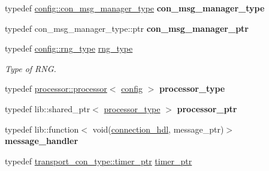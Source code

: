 \begin{DoxyCompactItemize}
\item 
typedef \hyperlink{classwebsocketpp_1_1message__buffer_1_1alloc_1_1con__msg__manager}{config\+::con\+\_\+msg\+\_\+manager\+\_\+type} {\bfseries con\+\_\+msg\+\_\+manager\+\_\+type}\hypertarget{classwebsocketpp_1_1connection_aa3fe3ecba9c63a04771c2ae34dd8dd56}{}\label{classwebsocketpp_1_1connection_aa3fe3ecba9c63a04771c2ae34dd8dd56}

\item 
typedef con\+\_\+msg\+\_\+manager\+\_\+type\+::ptr {\bfseries con\+\_\+msg\+\_\+manager\+\_\+ptr}\hypertarget{classwebsocketpp_1_1connection_a7bcb608b3a2a645bda4e4c4998f754c7}{}\label{classwebsocketpp_1_1connection_a7bcb608b3a2a645bda4e4c4998f754c7}

\item 
typedef \hyperlink{classwebsocketpp_1_1random_1_1none_1_1int__generator}{config\+::rng\+\_\+type} \hyperlink{classwebsocketpp_1_1connection_afc276f2f61d5b1acfadc64f91b3f89e5}{rng\+\_\+type}\hypertarget{classwebsocketpp_1_1connection_afc276f2f61d5b1acfadc64f91b3f89e5}{}\label{classwebsocketpp_1_1connection_afc276f2f61d5b1acfadc64f91b3f89e5}

\begin{DoxyCompactList}\small\item\em Type of R\+NG. \end{DoxyCompactList}\item 
typedef \hyperlink{classwebsocketpp_1_1processor_1_1processor}{processor\+::processor}$<$ \hyperlink{classconfig}{config} $>$ {\bfseries processor\+\_\+type}\hypertarget{classwebsocketpp_1_1connection_a77cd1bb26e05961a5fbc60708244d1fe}{}\label{classwebsocketpp_1_1connection_a77cd1bb26e05961a5fbc60708244d1fe}

\item 
typedef lib\+::shared\+\_\+ptr$<$ \hyperlink{classwebsocketpp_1_1processor_1_1processor}{processor\+\_\+type} $>$ {\bfseries processor\+\_\+ptr}\hypertarget{classwebsocketpp_1_1connection_a7e955b2fc98102bb3776e993f95c9009}{}\label{classwebsocketpp_1_1connection_a7e955b2fc98102bb3776e993f95c9009}

\item 
typedef lib\+::function$<$ void(\hyperlink{namespacewebsocketpp_a6b3d26a10ee7229b84b776786332631d}{connection\+\_\+hdl}, message\+\_\+ptr)$>$ {\bfseries message\+\_\+handler}\hypertarget{classwebsocketpp_1_1connection_a0091551000546d5f5f427379d852cae9}{}\label{classwebsocketpp_1_1connection_a0091551000546d5f5f427379d852cae9}

\item 
typedef \hyperlink{classwebsocketpp_1_1transport_1_1asio_1_1connection_aa725ead0a0f3733f7f7e57076f194081}{transport\+\_\+con\+\_\+type\+::timer\+\_\+ptr} \hyperlink{classwebsocketpp_1_1connection_aa13510ba1841ded8492a0483a294feb0}{timer\+\_\+ptr}\hypertarget{classwebsocketpp_1_1connection_aa13510ba1841ded8492a0483a294feb0}{}\label{classwebsocketpp_1_1connection_aa13510ba1841ded8492a0483a294feb0}


\end{DoxyCompactItemize}
